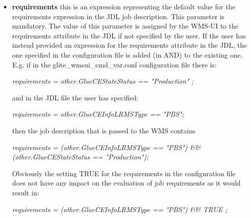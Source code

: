 \begin{itemize}
 \item \textbf{requirements} this is an expression representing the default value for the requirements expression 
   in the JDL job description. This parameter is mandatory. The value of this parameter is assigned by 
   the WMS-UI to the requirements attribute in the JDL if not specified by the user. If the user has instead 
   provided an expression for the requirements attribute in the JDL, the one specified in the configuration 
   file is added (in AND) to the existing one. 
   E.g. if in the glite\_wmsui\_cmd\_var.conf configuration file there is: 

   \begin{scriptsize}   
   \textit{requirements = other.GlueCEStateStatus == "Production" ;} 
   \end{scriptsize}

   and in the JDL file the user has specified: 

   \begin{scriptsize}   
   \textit{requirements = other.GlueCEInfoLRMSType == "PBS";} 
   \end{scriptsize}

   then the job description that is passed to the WMS contains 

   \begin{scriptsize}   
   \textit{requirements = (other.GlueCEInfoLRMSType == "PBS") \&\& (other.GlueCEStateStatus == "Production");} 
   \end{scriptsize}
      
   Obviously the setting TRUE for the requirements in the configuration file does not have any impact on the evaluation 
   of job requirements as it would result in: 

   \begin{scriptsize}   
   \textit{requirements = (other.GlueCEInfoLRMSType == "PBS") \&\& TRUE ;}
   \end{scriptsize}


\end{itemize}

